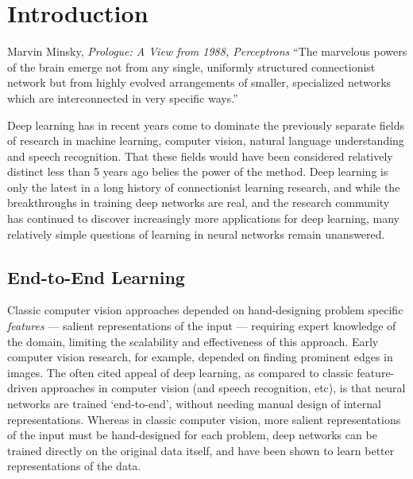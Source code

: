\documentclass[thesis]{subfiles}
\begin{document}

\chapter{Introduction}  %

\begin{chapquote}{Marvin Minsky, \textit{Prologue: A View from 1988, Perceptrons}}
``The marvelous powers of the brain emerge not from any single, uniformly structured connectionist network but from highly evolved arrangements of smaller, specialized networks which are interconnected in very specific ways.''
\end{chapquote}

Deep learning has in recent years come to dominate the previously separate fields of research in machine learning, computer vision, natural language understanding and speech recognition. That these fields would have been considered relatively distinct less than 5 years ago belies the power of the method. Deep learning is only the latest in a long history of connectionist learning research, and while the breakthroughs in training deep networks are real, and the research community has continued to discover increasingly more applications for deep learning, many relatively simple questions of learning in neural networks remain unanswered.

\section{End-to-End Learning}
Classic computer vision approaches depended on hand-designing problem specific \emph{features} --- salient representations of the input --- requiring expert knowledge of the domain, limiting the scalability and effectiveness of this approach. Early computer vision research, for example, depended on finding prominent edges in images. The often cited appeal of deep learning, as compared to classic feature-driven approaches in computer vision (and speech recognition, etc), is that neural networks are trained `end-to-end', \ie without needing manual design of internal representations. Whereas in classic computer vision, more salient representations of the input must be hand-designed for each problem, deep networks can be trained directly on the original data itself, and have been shown to learn better representations of the data.
\end{document}
